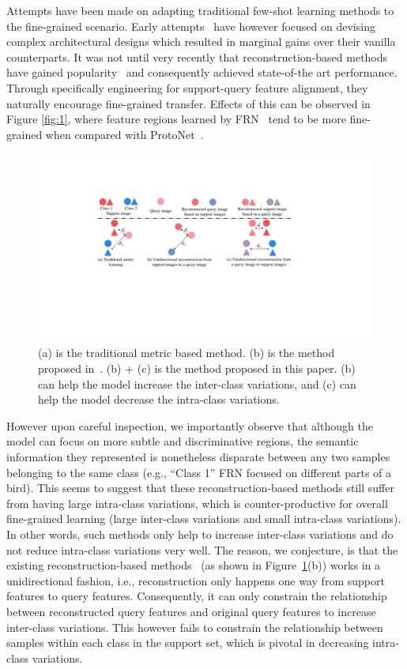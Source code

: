 \documentclass[letterpaper]{article} %
\begin{document}
Attempts have been made on adapting traditional few-shot learning methods to the fine-grained scenario. Early attempts~\cite{Huang2021LowRankPA, sun2020few, zhu2020multi} have however focused on devising complex architectural designs which resulted in marginal gains over their vanilla counterparts. It was not until very recently that reconstruction-based methods have gained popularity~\cite{Wertheimer_2021_CVPR, NEURIPS2020_fa28c6cd} and consequently achieved state-of-the art performance. Through specifically engineering for {support-query} feature alignment, they naturally encourage fine-grained transfer. Effects of this can be observed in Figure \ref{fig:1}, where feature regions learned by FRN~\cite{Wertheimer_2021_CVPR} tend to be more fine-grained when compared with ProtoNet~\cite{NIPS2017_cb8da676}.


\begin{figure}[ht]
  \centering
  \includegraphics[width=0.8\linewidth]{figures/1.2.pdf}
  \caption{(a) is the traditional metric based method. (b) is the method proposed in~\cite{Wertheimer_2021_CVPR}. (b) + (c) is the method proposed in this paper. (b) can help the model increase the inter-class variations, and (c) can help the model decrease the intra-class variations.}
  \label{fig:1.2}
\end{figure}


However upon careful inspection, we importantly observe that although the model can focus on more subtle and discriminative regions, the semantic information they represented is nonetheless disparate between any two samples belonging to the same class (e.g., ``Class 1'' FRN focused on different parts of a bird). This seems to suggest that these reconstruction-based methods still suffer from having large intra-class variations, which is counter-productive for overall fine-grained learning (large inter-class variations and small intra-class variations). In other words, such methods only help to increase inter-class variations and do not reduce intra-class variations very well. The reason, we conjecture, is that the existing reconstruction-based methods~\cite{Wertheimer_2021_CVPR, NEURIPS2020_fa28c6cd} (as shown in Figure~\ref{fig:1.2}(b)) works in a unidirectional fashion, i.e., reconstruction only happens one way from support features to query features.
Consequently, it can only constrain the relationship between reconstructed query features and original query features to increase inter-class variations. This however fails to constrain the relationship between samples within each class in the support set, which is pivotal in decreasing intra-class variations.
\end{document}
